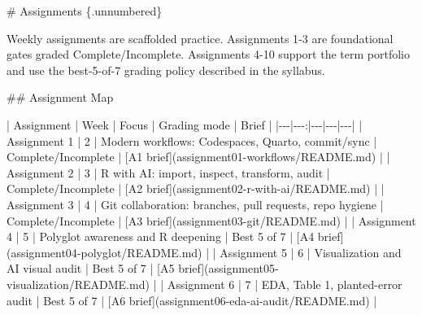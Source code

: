 \documentclass[
  letterpaper,
  DIV=11,
  numbers=noendperiod,
  oneside]{scrreprt}
\newenvironment{Shaded}{\begin{snugshade}}{\end{snugshade}}
\newcommand{\CommentTok}[1]{\textcolor[rgb]{0.37,0.37,0.37}{#1}}
\newcommand{\FunctionTok}[1]{\textcolor[rgb]{0.28,0.35,0.67}{#1}}
\newcommand{\NormalTok}[1]{\textcolor[rgb]{0.00,0.23,0.31}{#1}}
\newcommand{\OtherTok}[1]{\textcolor[rgb]{0.00,0.23,0.31}{#1}}
\newcommand{\PreprocessorTok}[1]{\textcolor[rgb]{0.68,0.00,0.00}{#1}}
\begin{document}
\begin{Shaded}
\begin{Highlighting}[numbers=left,,]
\FunctionTok{\# Assignments \{.unnumbered\}}


\NormalTok{Weekly assignments are scaffolded practice. Assignments 1{-}3 are foundational gates graded Complete/Incomplete. Assignments 4{-}10 support the term portfolio and use the best{-}5{-}of{-}7 grading policy described in the syllabus.}

\FunctionTok{\#\# Assignment Map}

\PreprocessorTok{|}\NormalTok{ Assignment }\PreprocessorTok{|}\NormalTok{ Week }\PreprocessorTok{|}\NormalTok{ Focus }\PreprocessorTok{|}\NormalTok{ Grading mode }\PreprocessorTok{|}\NormalTok{ Brief }\PreprocessorTok{|}
\PreprocessorTok{|{-}{-}{-}|{-}{-}{-}:|{-}{-}{-}|{-}{-}{-}|{-}{-}{-}|}
\PreprocessorTok{|}\NormalTok{ Assignment 1 }\PreprocessorTok{|}\NormalTok{ 2 }\PreprocessorTok{|}\NormalTok{ Modern workflows: Codespaces, Quarto, commit/sync }\PreprocessorTok{|}\NormalTok{ Complete/Incomplete }\PreprocessorTok{|} \CommentTok{[}\OtherTok{A1 brief}\CommentTok{](assignment01{-}workflows/README.md)} \PreprocessorTok{|}
\PreprocessorTok{|}\NormalTok{ Assignment 2 }\PreprocessorTok{|}\NormalTok{ 3 }\PreprocessorTok{|}\NormalTok{ R with AI: import, inspect, transform, audit }\PreprocessorTok{|}\NormalTok{ Complete/Incomplete }\PreprocessorTok{|} \CommentTok{[}\OtherTok{A2 brief}\CommentTok{](assignment02{-}r{-}with{-}ai/README.md)} \PreprocessorTok{|}
\PreprocessorTok{|}\NormalTok{ Assignment 3 }\PreprocessorTok{|}\NormalTok{ 4 }\PreprocessorTok{|}\NormalTok{ Git collaboration: branches, pull requests, repo hygiene }\PreprocessorTok{|}\NormalTok{ Complete/Incomplete }\PreprocessorTok{|} \CommentTok{[}\OtherTok{A3 brief}\CommentTok{](assignment03{-}git/README.md)} \PreprocessorTok{|}
\PreprocessorTok{|}\NormalTok{ Assignment 4 }\PreprocessorTok{|}\NormalTok{ 5 }\PreprocessorTok{|}\NormalTok{ Polyglot awareness and R deepening }\PreprocessorTok{|}\NormalTok{ Best 5 of 7 }\PreprocessorTok{|} \CommentTok{[}\OtherTok{A4 brief}\CommentTok{](assignment04{-}polyglot/README.md)} \PreprocessorTok{|}
\PreprocessorTok{|}\NormalTok{ Assignment 5 }\PreprocessorTok{|}\NormalTok{ 6 }\PreprocessorTok{|}\NormalTok{ Visualization and AI visual audit }\PreprocessorTok{|}\NormalTok{ Best 5 of 7 }\PreprocessorTok{|} \CommentTok{[}\OtherTok{A5 brief}\CommentTok{](assignment05{-}visualization/README.md)} \PreprocessorTok{|}
\PreprocessorTok{|}\NormalTok{ Assignment 6 }\PreprocessorTok{|}\NormalTok{ 7 }\PreprocessorTok{|}\NormalTok{ EDA, Table 1, planted{-}error audit }\PreprocessorTok{|}\NormalTok{ Best 5 of 7 }\PreprocessorTok{|} \CommentTok{[}\OtherTok{A6 brief}\CommentTok{](assignment06{-}eda{-}ai{-}audit/README.md)} \PreprocessorTok{|}

\end{Highlighting}
\end{Shaded}
\end{document}
